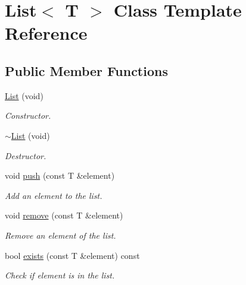 \hypertarget{class_list}{\section{List$<$ T $>$ Class Template Reference}
\label{class_list}
}
\subsection*{Public Member Functions}
\begin{DoxyCompactItemize}
\item 
\hypertarget{class_list_ae6a4229e888486c01c669894c5da20d9}{\hyperlink{class_list_ae6a4229e888486c01c669894c5da20d9}{List} (void)}\label{class_list_ae6a4229e888486c01c669894c5da20d9}

\begin{DoxyCompactList}\small\item\em Constructor. \end{DoxyCompactList}\item 
\hypertarget{class_list_a9ecd03e07c7d1555de8c709f7b438097}{\hyperlink{class_list_a9ecd03e07c7d1555de8c709f7b438097}{$\sim$\-List} (void)}\label{class_list_a9ecd03e07c7d1555de8c709f7b438097}

\begin{DoxyCompactList}\small\item\em Destructor. \end{DoxyCompactList}\item 
void \hyperlink{class_list_abc2db9db184c6db670643870f8b8cc7e}{push} (const T \&element)
\begin{DoxyCompactList}\small\item\em Add an element to the list. \end{DoxyCompactList}\item 
void \hyperlink{class_list_ab25e943a3f4ad57bc3d058c7a92019c4}{remove} (const T \&element)
\begin{DoxyCompactList}\small\item\em Remove an element of the list. \end{DoxyCompactList}\item 
bool \hyperlink{class_list_a1dba0a7391e4b3512cd757616fe6d13f}{exists} (const T \&element) const 
\begin{DoxyCompactList}\small\item\em Check if element is in the list. \end{DoxyCompactList}\end{DoxyCompactItemize}


